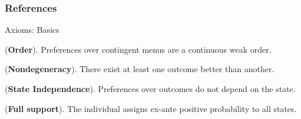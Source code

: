 \documentclass[usenames,dvipsnames,aspectratio=169,11pt, envcountsect, handout]{beamer}
\begin{document}
\begin{frame}

	\frametitle{References}

	
	


\end{frame}

\appendix

\begin{frame}{Axioms: Basics}\label{axiomsb1main}

	\begin{axiom}\label{ax:order}
		 (\textbf{Order}). Preferences over contingent menus are a continuous weak order. \hyperlink{axiomsb1}{}
	\end{axiom}

	\begin{axiom}\label{ax:degeneracy}

		(\textbf{Nondegeneracy}). There exist at least one outcome better than another. \hyperlink{axiomsb2}{}

	\end{axiom}

	\begin{axiom}\label{ax:sindependence}

		(\textbf{\textbf{State Independence}}). Preferences over outcomes do not depend on the state.
	\end{axiom}

	\begin{axiom}\label{ax:support}

		(\textbf{\textbf{Full support}}). The individual assigns ex-ante positive probability to all states.
	\end{axiom}
\end{frame}
\end{document}
